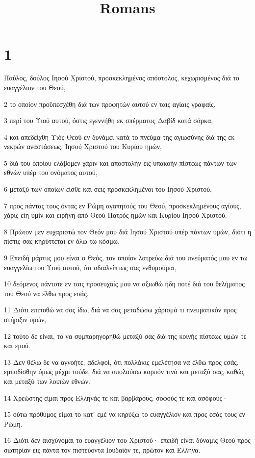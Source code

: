 

\title{Romans}


\chapter{1}

\par Παύλος, δούλος Ιησού Χριστού, προσκεκλημένος απόστολος, κεχωρισμένος διά το ευαγγέλιον του Θεού,
\par 2 το οποίον προϋπεσχέθη διά των προφητών αυτού εν ταις αγίαις γραφαίς,
\par 3 περί του Υιού αυτού, όστις εγεννήθη εκ σπέρματος Δαβίδ κατά σάρκα,
\par 4 και απεδείχθη Υιός Θεού εν δυνάμει κατά το πνεύμα της αγιωσύνης διά της εκ νεκρών αναστάσεως, Ιησού Χριστού του Κυρίου ημών,
\par 5 διά του οποίου ελάβομεν χάριν και αποστολήν εις υπακοήν πίστεως πάντων των εθνών υπέρ του ονόματος αυτού,
\par 6 μεταξύ των οποίων είσθε και σεις προσκεκλημένοι του Ιησού Χριστού,
\par 7 προς πάντας τους όντας εν Ρώμη αγαπητούς του Θεού, προσκεκλημένους αγίους, χάρις είη υμίν και ειρήνη από Θεού Πατρός ημών και Κυρίου Ιησού Χριστού.
\par 8 Πρώτον μεν ευχαριστώ τον Θεόν μου διά Ιησού Χριστού υπέρ πάντων υμών, διότι η πίστις σας κηρύττεται εν όλω τω κόσμω.
\par 9 Επειδή μάρτυς μου είναι ο Θεός, τον οποίον λατρεύω διά του πνεύματός μου εν τω ευαγγελίω του Υιού αυτού, ότι αδιαλείπτως σας ενθυμούμαι,
\par 10 δεόμενος πάντοτε εν ταις προσευχαίς μου να αξιωθώ ήδη ποτέ διά του θελήματος του Θεού να έλθω προς εσάς.
\par 11 Διότι επιποθώ να σας ίδω, διά να σας μεταδώσω χάρισμά τι πνευματικόν προς στήριξιν υμών,
\par 12 τούτο δε είναι, το να συμπαρηγορηθώ μεταξύ σας διά της κοινής πίστεως υμών τε και εμού.
\par 13 Δεν θέλω δε να αγνοήτε, αδελφοί, ότι πολλάκις εμελέτησα να έλθω προς εσάς, εμποδίσθην όμως μέχρι τούδε, διά να απολαύσω καρπόν τινά και μεταξύ σας, καθώς και μεταξύ των λοιπών εθνών.
\par 14 Χρεώστης είμαι προς Ελληνάς τε και βαρβάρους, σοφούς τε και ασόφους·
\par 15 ούτω πρόθυμος είμαι το κατ' εμέ να κηρύξω το ευαγγέλιον και προς εσάς τους εν Ρώμη.
\par 16 Διότι δεν αισχύνομαι το ευαγγέλιον του Χριστού· επειδή είναι δύναμις Θεού προς σωτηρίαν εις πάντα τον πιστεύοντα Ιουδαίόν τε, πρώτον και Έλληνα.
